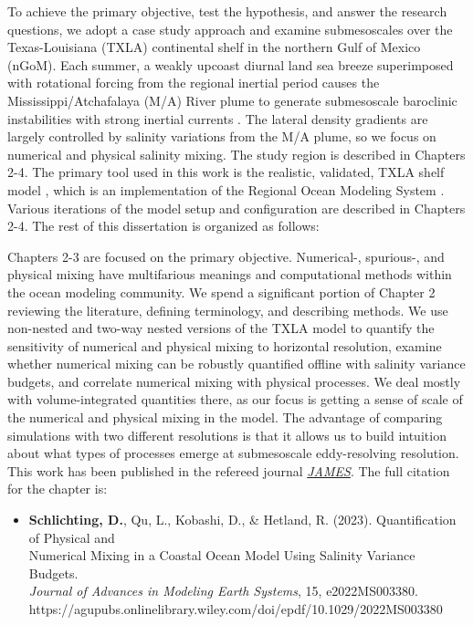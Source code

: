 To achieve the primary objective, test the hypothesis, and answer the research questions, we adopt a case study approach and examine submesoscales over the Texas-Louisiana (TXLA) continental shelf in the northern Gulf of Mexico (nGoM). Each summer, a weakly upcoast diurnal land sea breeze superimposed with rotational forcing from the regional inertial period causes the Mississippi/Atchafalaya (M/A) River plume to generate submesoscale baroclinic instabilities with strong inertial currents \citep{Hetland_2017, Kobashi_2020, qu2022rapid}. The lateral density gradients are largely controlled by salinity variations from the M/A plume, so we focus on numerical and physical salinity mixing. The study region is described in Chapters 2-4. The primary tool used in this work is the realistic, validated, TXLA shelf model \citep{Kobashi_2020, Schlichting23, Zhang_2012_forecast}, which is an implementation of the Regional Ocean Modeling System \citep[ROMS, ][]{shchepetkin2005regional}. Various iterations of the model setup and configuration are described in Chapters 2-4. The rest of this dissertation is organized as follows: 

Chapters 2-3 are focused on the primary objective. Numerical-, spurious-, and physical mixing have multifarious meanings and computational methods within the ocean modeling community. We spend a significant portion of Chapter 2 reviewing the literature, defining terminology, and describing methods. We use non-nested and two-way nested versions of the TXLA model to quantify the sensitivity of numerical and physical mixing to horizontal resolution, examine whether numerical mixing can be robustly quantified offline with salinity variance budgets, and correlate numerical mixing with physical processes. We deal mostly with volume-integrated quantities there, as our focus is getting a sense of scale of the numerical and physical mixing in the model. The advantage of comparing simulations with two different resolutions is that it allows us to build intuition about what types of processes emerge at submesoscale eddy-resolving resolution. This work has been published in the refereed journal \href{https://agupubs.onlinelibrary.wiley.com/doi/epdf/10.1029/2022MS003380}{\textit{JAMES}}. The full citation for the chapter is:

\begin{itemize}
    \item[] \textbf{Schlichting, D.}, Qu, L., Kobashi, D., \& Hetland, R. (2023). Quantification of Physical and \\
    \hspace{\labelwidth} Numerical Mixing in a Coastal Ocean Model Using Salinity Variance Budgets.\\ 
        \hspace{\labelwidth} \textit{Journal of Advances in Modeling Earth Systems}, 15, e2022MS003380. \\
        \hspace{\labelwidth} https://agupubs.onlinelibrary.wiley.com/doi/epdf/10.1029/2022MS003380
\end{itemize}

